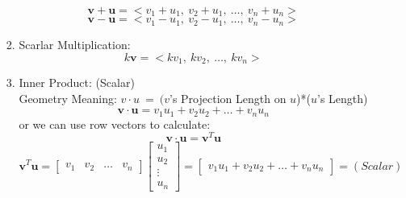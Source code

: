 \documentclass[12px]{article}
\begin{document}
\begin{enumerate}
\begin{enumerate}[(1)]
\begin{enumerate}
            $$\textbf{v}+\textbf{u}=<v_1+u_1,\ v_2+u_1,\ \dots,\ v_n+u_n>$$
            $$\textbf{v}-\textbf{u}=<v_1-u_1,\ v_2-u_1,\ \dots,\ v_n-u_n>$$
            \item Scarlar Multiplication: 
            $$k\textbf{v}=<kv_1,\ kv_2,\ \dots,\ kv_n>$$
            \item Inner Product: (Scalar)\\
            Geometry Meaning: $v \cdot u\ =\ (v$'s Projection Length on $u$)*($u$'s Length)
            $$\textbf{v}\cdot\textbf{u}=v_1u_1+v_2u_2+ \dots +v_nu_n$$
            or we can use row vectors to calculate:
            $$\textbf{v}\cdot\textbf{u}=\textbf{v}^T\textbf{u}$$
            $$\textbf{v}^T\textbf{u}=
            \begin{bmatrix}v_1 &v_2 &\dots &v_n\end{bmatrix}\begin{bmatrix}u_1\\u_2\\ \vdots\\u_n\end{bmatrix}=
            \begin{bmatrix}
                v_1u_1+v_2u_2+ \dots +v_nu_n
            \end{bmatrix}=(Scalar)$$
            

\end{enumerate}
\end{enumerate}
\end{enumerate}
\end{document}
